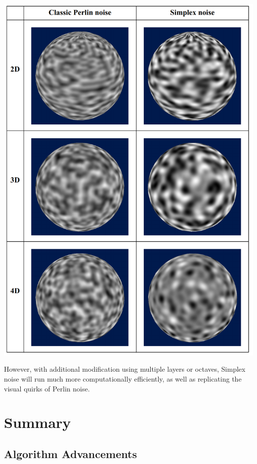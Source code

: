 \documentclass[10pt]{report}
\begin{document}
		\begin{minipage}{\textwidth}
			\centering
			\includegraphics[scale=.25]{perlin vs simplex}
			\label{fig:fig4}
		\end{minipage}
	
		However, with additional modification using multiple layers or octaves, Simplex noise will run much more computationally efficiently, as well as replicating the visual quirks of Perlin noise. 
			
	\vspace{10pt}
	\let\clearpage\relax
	\chapter{Summary}
		
		\section{Algorithm Advancements}
		
\end{document}
